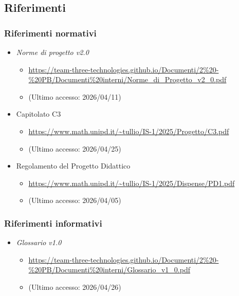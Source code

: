 \documentclass[a4paper,12pt]{article}
\begin{document}
{        \subsection{Riferimenti} {
            \subsubsection{Riferimenti normativi} {
                \begin{itemize}
                    \item \textit{Norme di progetto v2.0}
                    \begin{itemize}
                        \item \url{https://team-three-technologies.github.io/Documenti/2%20-%20PB/Documenti%20interni/Norme_di_Progetto_v2_0.pdf}
                        \item[] (Ultimo accesso: 2026/04/11)
                    \end{itemize}
                    \item Capitolato C3
                    \begin{itemize}
                        \item \url{https://www.math.unipd.it/~tullio/IS-1/2025/Progetto/C3.pdf}
                        \item[] (Ultimo accesso: 2026/04/25)
                    \end{itemize}
                    \item Regolamento del Progetto Didattico
                    \begin{itemize}
                        \item \url{https://www.math.unipd.it/~tullio/IS-1/2025/Dispense/PD1.pdf}
                        \item[] (Ultimo accesso: 2026/04/05)
                    \end{itemize}
                \end{itemize}
            }
            \subsubsection{Riferimenti informativi} {
                \begin{itemize}
                    \item \textit{Glossario v1.0}
                    \begin{itemize}
                        \item \url{https://team-three-technologies.github.io/Documenti/2%20-%20PB/Documenti%20interni/Glossario_v1_0.pdf}
                        \item[] (Ultimo accesso: 2026/04/26)
                    \end{itemize}
                \end{itemize}
            }
        }
    }
\end{document}
